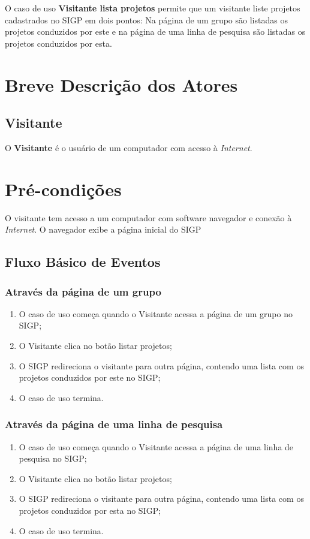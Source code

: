 \documentclass[11pt, a4paper,oneside]{book}
\begin{document}
O caso de uso \textbf{Visitante lista projetos} permite que um visitante liste projetos cadastrados no SIGP em dois pontos: Na página de um grupo são listadas os projetos conduzidos por este e na página de uma linha de pesquisa são listadas os projetos conduzidos por esta.

\section{Breve Descrição dos Atores}

\subsection{Visitante}

O \textbf{Visitante} é o usuário de um computador com acesso à \emph{Internet}.

\section{Pré-condições}
O visitante tem acesso a um computador com software navegador e conexão à \emph{Internet}.
O navegador exibe a página inicial do SIGP

\subsection{Fluxo Básico de Eventos}

\subsubsection{Através da página de um grupo}
\begin{enumerate}
\item O caso de uso começa quando o Visitante acessa a página de um grupo no SIGP;
\item O Visitante clica no botão listar projetos;
\item O SIGP redireciona o visitante para outra página, contendo uma lista com os projetos conduzidos por este no SIGP;
\item O caso de uso termina.
\end{enumerate}

\subsubsection{Através da página de uma linha de pesquisa}
\begin{enumerate}
\item O caso de uso começa quando o Visitante acessa a página de uma linha de pesquisa no SIGP;
\item O Visitante clica no botão listar projetos;
\item O SIGP redireciona o visitante para outra página, contendo uma lista com os projetos conduzidos por esta no SIGP;
\item O caso de uso termina.
\end{enumerate}
\end{document}
